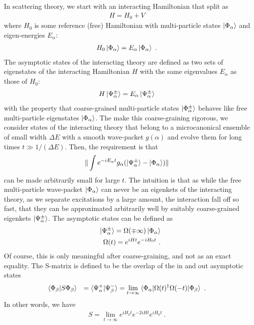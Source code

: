 \documentclass[a4paper,11pt]{article}
\theoremstyle{definition}
\newcommand{\nn}{\nonumber}
\begin{document}
In scattering theory, we start with an interacting Hamiltonian that split as 
\begin{eqnarray}
H=H_0+V
\end{eqnarray}
where $H_0$ is some reference (free) Hamiltonian with multi-particle states $\ket{\Phi_\alpha}$ and eigen-energies $E_\alpha$:
\begin{eqnarray}
H_0\ket{\Phi_\alpha}=E_\alpha \ket{\Phi_\alpha}\ .
\end{eqnarray}
The asymptotic states of the interacting theory are defined as two sets of eigenstates of the interacting Hamiltonian $H$ with the same eigenvalues $E_\alpha$ as those of $H_0$:
\begin{eqnarray}
H\ket{\Psi_\alpha^\pm}=E_\alpha \ket{\Psi_\alpha^\pm}
\end{eqnarray}
with the property that coarse-grained multi-particle states $\ket{\Phi_\alpha^\pm}$ behaves like free multi-particle eigenstates $\ket{\Phi_\alpha}$. The make this coarse-graining rigorous, we consider states of the interacting theory that belong to a microcanonical ensemble of small width $\Delta E$ with a smooth wave-packet $g(\alpha)$ and evolve them for long times $t\gg 1/(\Delta E)$. Then, the requirement is that 
\begin{eqnarray}
\|\int e^{-i E_\alpha t}g_\alpha (\ket{\Psi^\pm_\alpha}-\ket{\Phi_\alpha})\|
\end{eqnarray}
can be made arbitrarily small for large $t$. The intuition is that as while the free multi-particle wave-packet $\ket{\Phi_\alpha}$ can never be an eigenkets of the interacting theory, as we separate excitations by a large amount, the interaction fall off so fast, that they can be approximated arbitrarily well by suitably coarse-grained eigenkets $\ket{\Psi_\alpha^\pm}$. The asymptotic states can be defined as 
\begin{eqnarray}
&&\ket{\Psi_\alpha^\pm}=\Omega(\mp \infty)\ket{\Phi_\alpha}\nn\\
&&\Omega(t)=e^{i Ht}e^{-i H_0t}\ .
\end{eqnarray}
Of course, this is only meaningful after coarse-graining, and not as an exact equality. The S-matrix is defined to be the overlap of the in and out asymptotic states
\begin{eqnarray}
\braket{\Phi_\beta|S \Phi_\beta}&&=\braket{\Psi_\alpha^+|\Psi_\beta^-}=\lim_{t\to \infty}\braket{\Phi_\alpha|\Omega(t)^\dagger \Omega(-t)|\Phi_\beta}\ .
\end{eqnarray}
In other words, we have
\begin{eqnarray}
S=\lim_{t\to \infty} e^{i H_0t} e^{-2i Ht}e^{i H_0t}\ .
\end{eqnarray} 
\end{document}
